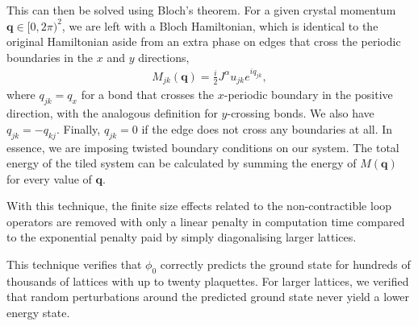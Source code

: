 This can then be solved using Bloch's theorem. For a given crystal momentum \(\textbf{q} \in [0,2\pi)^2\), we are left with a Bloch Hamiltonian, which is identical to the original Hamiltonian aside from an extra phase on edges that cross the periodic boundaries in the \(x\) and \(y\) directions, \[\begin{aligned}
    M_{jk}(\textbf{q}) =  \frac{i}{2} J^{\alpha} u_{jk} e^{i q_{jk}},\end{aligned}\] where \(q_{jk} = q_x\) for a bond that crosses the \(x\)-periodic boundary in the positive direction, with the analogous definition for \(y\)-crossing bonds. We also have \(q_{jk} = -q_{kj}\). Finally, \(q_{jk} = 0\) if the edge does not cross any boundaries at all. In essence, we are imposing twisted boundary conditions on our system. The total energy of the tiled system can be calculated by summing the energy of \(M( \textbf{q})\) for every value of \(\textbf{q}\).

With this technique, the finite size effects related to the non-contractible loop operators are removed with only a linear penalty in computation time compared to the exponential penalty paid by simply diagonalising larger lattices.

This technique verifies that \(\phi_0\) correctly predicts the ground state for hundreds of thousands of lattices with up to twenty plaquettes. For larger lattices, we verified that random perturbations around the predicted ground state never yield a lower energy state.
